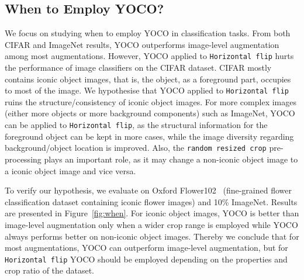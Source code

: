 \documentclass{article}
\begin{document}
\subsection{When to Employ YOCO?}
We focus on studying when to employ YOCO in classification tasks. From both CIFAR and ImageNet results, YOCO outperforms image-level augmentation among most augmentations. However, YOCO applied to \texttt{Horizontal flip} hurts the performance of image classifiers on the CIFAR dataset. CIFAR mostly contains iconic object images, that is, the object, as a foreground part, occupies to most of the image. We hypothesise that YOCO applied to \texttt{Horizontal flip} ruins the structure/consistency of iconic object images. For more complex images (either more objects or more background components) such as ImageNet, YOCO can be applied to \texttt{Horizontal flip}, as the structural information for the foreground object can be kept in more cases, while the image diversity regarding background/object location is improved. Also, the \texttt{random resized crop} pre-processing plays an important role, as it may change a non-iconic object image to a iconic object image and vice versa. 

To verify our hypothesis, we evaluate on Oxford Flower102~\cite{flower} (fine-grained flower classification dataset containing iconic flower images) and 10\% ImageNet. Results are presented in Figure~\ref{fig:when}. For iconic object images, YOCO is better than image-level augmentation only when a wider crop range is employed while YOCO always performs better on non-iconic object images. Thereby we conclude that for most augmentations, YOCO can outperform image-level augmentation, but for \texttt{Horizontal flip} YOCO should be employed depending on the properties and crop ratio of the dataset.
\end{document}
